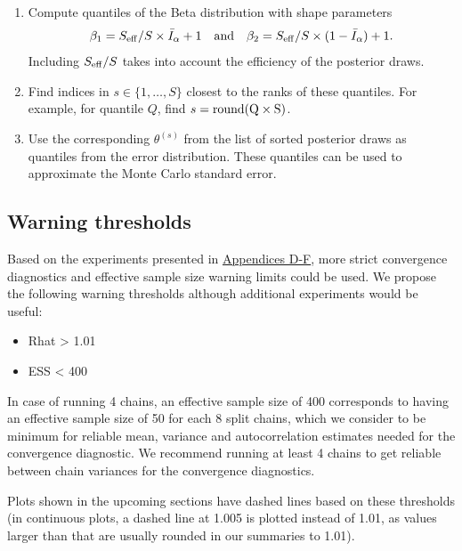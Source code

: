 \documentclass[american,]{article}
\providecommand{\tightlist}{%
  \setlength{\itemsep}{0pt}\setlength{\parskip}{0pt}}
\begin{document}
\begin{enumerate}
\def\labelenumi{\arabic{enumi}.}
\item
  Compute quantiles of the Beta distribution with shape parameters
  \begin{equation}
  \beta_1 = S_{\rm eff} / S \times \bar{I}_\alpha+1 \quad \text{and} \quad
  \beta_2 = S_{\rm eff} / S \times (1-\bar{I}_\alpha) + 1.
  \end{equation} Including \(S_{\rm eff}/S\) takes into account the
  efficiency of the posterior draws.
\item
  Find indices in \(s \in \{1,\ldots,S\}\) closest to the ranks of these
  quantiles. For example, for quantile \(Q\), find
  \(s = {\rm round(Q \times S)}\).
\item
  Use the corresponding \(\theta^{(s)}\) from the list of sorted
  posterior draws as quantiles from the error distribution. These
  quantiles can be used to approximate the Monte Carlo standard error.
\end{enumerate}

\hypertarget{warning-thresholds}{%
\subsection{Warning thresholds}\label{warning-thresholds}}

Based on the experiments presented in
\protect\hyperlink{AppendixD}{Appendices D-F}, more strict convergence
diagnostics and effective sample size warning limits could be used. We
propose the following warning thresholds although additional experiments
would be useful:

\begin{itemize}
\tightlist
\item
  Rhat \textgreater{} 1.01
\item
  ESS \textless{} 400
\end{itemize}

In case of running 4 chains, an effective sample size of 400 corresponds
to having an effective sample size of 50 for each 8 split chains, which
we consider to be minimum for reliable mean, variance and
autocorrelation estimates needed for the convergence diagnostic. We
recommend running at least 4 chains to get reliable between chain
variances for the convergence diagnostics.

Plots shown in the upcoming sections have dashed lines based on these
thresholds (in continuous plots, a dashed line at 1.005 is plotted
instead of 1.01, as values larger than that are usually rounded in our
summaries to 1.01).
\end{document}
